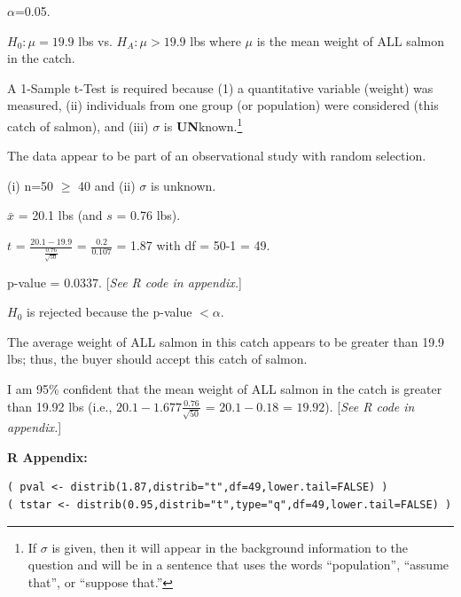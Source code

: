 \documentclass[10pt,openany]{book}\usepackage[]{graphicx}\usepackage[]{color}
\makeatletter
\newenvironment{kframe}{%
 \def\at@end@of@kframe{}%
 \ifinner\ifhmode%
  \def\at@end@of@kframe{\end{minipage}}%
  \begin{minipage}{\columnwidth}%
 \fi\fi%
 \def\FrameCommand##1{\hskip\@totalleftmargin \hskip-\fboxsep
 \colorbox{shadecolor}{##1}\hskip-\fboxsep
     \hskip-\linewidth \hskip-\@totalleftmargin \hskip\columnwidth}%
 \MakeFramed {\advance\hsize-\width
   \@totalleftmargin\z@ \linewidth\hsize
   \@setminipage}}%
 {\par\unskip\endMakeFramed%
 \at@end@of@kframe}
\newenvironment{knitrout}{}{} %
\makeatother
\begin{document}
\begin{Enumerate}
    \item $\alpha$=0.05.
    \item $H_{0}:\mu=19.9$ lbs vs. $H_{A}:\mu >19.9$ lbs where $\mu$ is the mean weight of ALL salmon in the catch.
    \item A 1-Sample t-Test is required because (1) a quantitative variable (weight) was measured, (ii) individuals from one group (or population) were considered (this catch of salmon), and (iii) $\sigma$ is \textbf{UN}known.\footnote{If $\sigma$ is given, then it will appear in the background information to the question and will be in a sentence that uses the words ``population'', ``assume that'', or ``suppose that.''}
    \item The data appear to be part of an observational study with random selection.
    \item (i) n=50 $\geq$ 40 and (ii) $\sigma$ is unknown.
    \item $\bar{x}$ = 20.1 lbs (and $s$ = 0.76 lbs).
    \item $t$ = $\frac{20.1-19.9}{\frac{0.76}{\sqrt{50}}}$ = $\frac{0.2}{0.107}$ = 1.87 with df = 50-1 = 49.
    \item p-value = $0.0337$. [\textit{See R code in appendix.}]
    \item $H_{0}$ is rejected because the p-value $< \alpha$.
    \item The average weight of ALL salmon in this catch appears to be greater than 19.9 lbs; thus, the buyer should accept this catch of salmon.
    \item I am 95\% confident that the mean weight of ALL salmon in the catch is greater than 19.92 lbs (i.e., $20.1-1.677\frac{0.76}{\sqrt{50}}$ = $20.1-0.18$ = $19.92$). [\textit{See R code in appendix.}]
\end{Enumerate}

\vspace{-6pt}
\begin{minipage}{\textwidth}
\textbf{R Appendix:}
\vspace{-6pt}
\begin{knitrout}
\color{fgcolor}\begin{kframe}
\begin{verbatim}
( pval <- distrib(1.87,distrib="t",df=49,lower.tail=FALSE) )
( tstar <- distrib(0.95,distrib="t",type="q",df=49,lower.tail=FALSE) )
\end{verbatim}
\end{kframe}
\end{knitrout}
\end{minipage}
\end{document}
